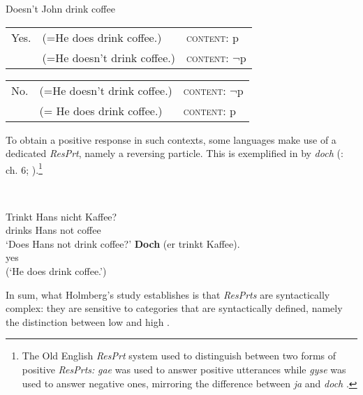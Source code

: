 \documentclass[output=paper]{LSP/langsci}
\begin{document}
\ea\label{ex:wiltschko:13}
\begin{xlist}   {Doesn’t John drink coffee}
\begin{xlisti}
      \ex\relax \begin{tabular}[t]{lll} {Yes}. & (={He does drink coffee.})    & \textsc{content:} p\\
                                               & (={He doesn’t drink coffee.}) & \textsc{content:} $¬$p\\ 
                \end{tabular}
      \ex       \begin{tabular}[t]{lll} No.    & (={He doesn’t drink coffee.}) & \textsc{content:} $¬$p\\
                                               & (= {He does drink coffee.})   & \textsc{content:} p  
                \end{tabular}
\end{xlisti}
\end{xlist}
\z

\noindent To obtain a positive response in such contexts, some languages make use of a dedicated \textit{ResPrt}, namely a  reversing particle.
This is exemplified in  by  \textit{doch} (\citealt{holmberg:15}: ch. 6; \citealt{Krifka2013}).\footnote{The Old English \textit{ResPrt} system used to distinguish between two forms of positive \textit{ResPrts:} \textit{gae} was used to answer positive utterances while \textit{gyse} was used to answer negative ones, mirroring the difference between  \textit{ja} and \textit{doch} \citep{WallageVanderWurff2013}.}  

\ea\label{ex:wiltschko:14}
\\
\begin{xlist}
   \gll Trinkt Hans nicht Kaffee?     \\
   drinks Hans  not   coffee \\
\glt ‘Does Hans not drink coffee?’
  \gll \textbf{Doch} (er trinkt Kaffee).\\ 
  yes\\
  \glt (‘He does drink coffee.’)
\end{xlist}
\z

\noindent In sum, what Holmberg’s study establishes is that \textit{ResPrts} are syntactically complex: they are sensitive to categories that are syntactically defined, namely the distinction between low and high .
\end{document}
